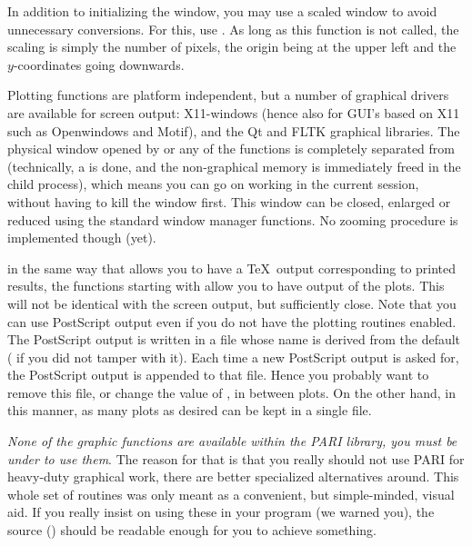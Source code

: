    In addition to initializing the window, you may use a scaled window to
avoid unnecessary conversions. For this, use . As long as this
function is not called, the scaling is simply the number of pixels, the
origin being at the upper left and the $y$-coordinates going downwards.

   Plotting functions are platform independent, but a number of graphical
drivers are available for screen output: X11-windows (hence also for GUI's
based on X11 such as Openwindows and Motif), and the Qt and FLTK graphical
libraries. The physical window opened by  or any of the
 functions is completely separated from  (technically, a
 is done, and the non-graphical memory is immediately freed in the
child process), which means you can go on working in the current 
session, without having to kill the window first. This window can be closed,
enlarged or reduced using the standard window manager functions. No zooming
procedure is implemented though (yet).

 in the same way that  allows you to have a \TeX\ output
corresponding to printed results, the functions starting with  allow
you to have  output of the plots. This will not be identical
with the screen output, but sufficiently close. Note that you can use
PostScript output even if you do not have the plotting routines enabled. The
PostScript output is written in a file whose name is derived from the
 default ( if you did not tamper with it). Each
time a new PostScript output is asked for, the PostScript output is appended
to that file. Hence you probably want to remove this file, or change the
value of , in between plots. On the other hand, in this manner,
as many plots as desired can be kept in a single file. \smallskip

 \emph{None of the graphic functions are available
within the PARI library, you must be under  to use them}. The reason
for that is that you really should not use PARI for heavy-duty graphical work,
there are better specialized alternatives around. This whole set of routines
was only meant as a convenient, but simple-minded, visual aid. If you really
insist on using these in your program (we warned you), the source
() should be readable enough for you to achieve something.


